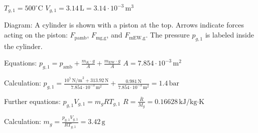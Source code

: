 \( T_{g,1} = 500^\circ \text{C} \)  
\( V_{g,1} = 3.14 \, \text{L} = 3.14 \cdot 10^{-3} \, \text{m}^3 \)  

Diagram:  
A cylinder is shown with a piston at the top. Arrows indicate forces acting on the piston: \( F_{\text{pamb}} \), \( F_{\text{mg,g}} \), and \( F_{\text{mEW,g}} \). The pressure \( p_{g,1} \) is labeled inside the cylinder.  

Equations:  
\( p_{g,1} = p_{\text{amb}} + \frac{m_{K} \cdot g}{A} + \frac{m_{\text{EW}} \cdot g}{A} \)  
\( A = 7.854 \cdot 10^{-3} \, \text{m}^2 \)  

Calculation:  
\( p_{g,1} = \frac{10^5 \, \text{N/m}^2 + 313.92 \, \text{N}}{7.854 \cdot 10^{-3} \, \text{m}^2} + \frac{0.981 \, \text{N}}{7.854 \cdot 10^{-3} \, \text{m}^2} = 1.4 \, \text{bar} \)  

Further equations:  
\( p_{g,1} V_{g,1} = m_{g} R T_{g,1} \)  
\( R = \frac{\bar{R}}{M_{g}} = 0.16628 \, \text{kJ/kg·K} \)  

Calculation:  
\( m_{g} = \frac{p_{g,1} V_{g,1}}{R T_{g,1}} = 3.42 \, \text{g} \)